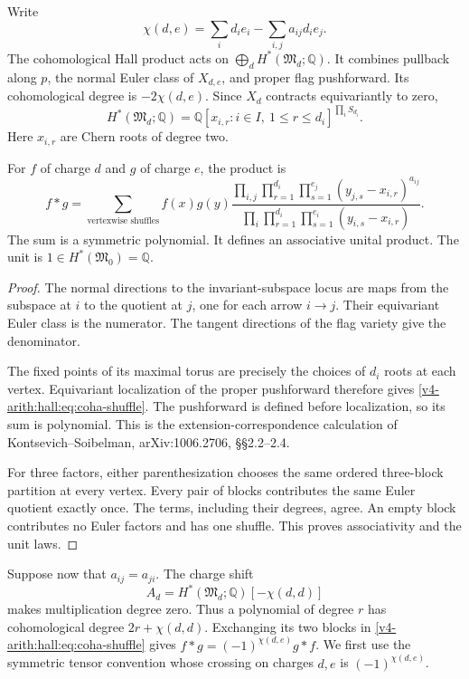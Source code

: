 Write
\[
 \chi(d,e)=\sum_i d_i e_i-\sum_{i,j}a_{ij}d_i e_j.
\]
The cohomological Hall product acts on
$\bigoplus_d H^*(\mathfrak M_d;\mathbb Q)$. It combines pullback along
$p$, the normal Euler class of $X_{d,e}$, and proper flag pushforward. Its
cohomological degree is $-2\chi(d,e)$.
Since $X_d$ contracts equivariantly to zero,
\[
 H^*(\mathfrak M_d;\mathbb Q)
 =\mathbb Q[x_{i,r}:i\in I,\ 1\leq r\leq d_i]^{\prod_i S_{d_i}}.
\]
Here $x_{i,r}$ are Chern roots of degree two.

\begin{theorem}
\label{v4-arith:hall:thm:coha-shuffle}
For $f$ of charge $d$ and $g$ of charge $e$, the product is
\begin{equation}\label{v4-arith:hall:eq:coha-shuffle}
 f*g=\sum_{\text{vertexwise shuffles}}
 f(x)g(y)
 \frac{\displaystyle\prod_{i,j}\prod_{r=1}^{d_i}
                    \prod_{s=1}^{e_j}(y_{j,s}-x_{i,r})^{a_{ij}}}
      {\displaystyle\prod_i\prod_{r=1}^{d_i}
                    \prod_{s=1}^{e_i}(y_{i,s}-x_{i,r})}.
\end{equation}
The sum is a symmetric polynomial. It defines an associative unital
product. The unit is $1\in H^*(\mathfrak M_0)=\mathbb Q$.
\end{theorem}
\begin{proof}
The normal directions to the invariant-subspace locus are maps from
the subspace at $i$ to the quotient at $j$, one for each arrow
$i\to j$. Their equivariant Euler class is the numerator.
The tangent directions of the flag variety give the denominator.

The fixed points of its maximal torus are precisely the choices of
$d_i$ roots at each vertex. Equivariant localization of the proper
pushforward therefore gives \eqref{v4-arith:hall:eq:coha-shuffle}.
The pushforward is defined before localization, so its sum is polynomial.
This is the extension-correspondence calculation of
Kontsevich--Soibelman, arXiv:1006.2706, \S\S2.2--2.4.

For three factors, either parenthesization chooses the same ordered
three-block partition at every vertex. Every pair of blocks contributes
the same Euler quotient exactly once. The terms, including their
degrees, agree. An empty block contributes no Euler factors and has
one shuffle. This proves associativity and the unit laws.
\end{proof}

Suppose now that $a_{ij}=a_{ji}$. The charge shift
\[
 A_d=H^*(\mathfrak M_d;\mathbb Q)[-\chi(d,d)]
\]
makes multiplication degree zero. Thus a polynomial of degree $r$
has cohomological degree $2r+\chi(d,d)$. Exchanging its two blocks
in \eqref{v4-arith:hall:eq:coha-shuffle} gives
$f*g=(-1)^{\chi(d,e)}g*f$.
We first use the symmetric tensor convention whose crossing on
charges $d,e$ is $(-1)^{\chi(d,e)}$.

